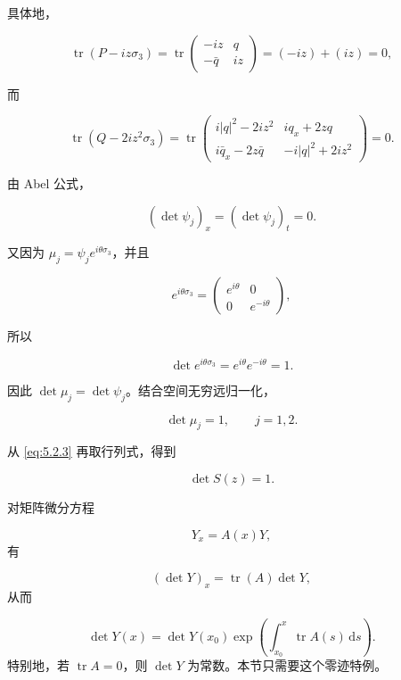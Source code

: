 \documentclass[
    lang=cn,
    scheme=chinese,
    mode=simple,
    device=normal,
    color=blue,
    math=cm,
    thmcnt=section,
    12pt
]{elegantbook}
\begin{document}
具体地，

\[
    \operatorname{tr}(P-iz\sigma_3)
    =
    \operatorname{tr}
    \begin{pmatrix}
        -iz & q \\
        -\bar q & iz
    \end{pmatrix}
    =
    (-iz)+(iz)
    =0,
\]

而

\[
    \operatorname{tr}(Q-2iz^2\sigma_3)
    =
    \operatorname{tr}
    \begin{pmatrix}
        i\lvert q\rvert^2-2iz^2 & iq_x+2zq \\
        i\bar q_x-2z\bar q & -i\lvert q\rvert^2+2iz^2
    \end{pmatrix}
    =0.
\]

由 Abel 公式，

\begin{equation}
    (\det\psi_j)_x
    =
    (\det\psi_j)_t
    =
    0.
    \tag{5.2.20}
    \label{eq:5.2.20}
\end{equation}

又因为 $\mu_j=\psi_je^{i\theta\sigma_3}$，并且

\[
    e^{i\theta\sigma_3}
    =
    \begin{pmatrix}
        e^{i\theta} & 0 \\
        0 & e^{-i\theta}
    \end{pmatrix},
\]

所以

\[
    \det e^{i\theta\sigma_3}
    =
    e^{i\theta}e^{-i\theta}
    =1.
\]

因此 $\det\mu_j=\det\psi_j$。结合空间无穷远归一化，

\begin{equation}
    \det\mu_j=1,\qquad j=1,2.
    \tag{5.2.21}
    \label{eq:5.2.21}
\end{equation}

从 \eqref{eq:5.2.3} 再取行列式，得到

\[
    \det S(z)=1.
\]

\begin{callout}
    对矩阵微分方程

    \[
        Y_x=A(x)Y,
    \]
    有

    \[
        (\det Y)_x=\operatorname{tr}(A)\det Y,
    \]
    从而

    \[
        \det Y(x)
        =
        \det Y(x_0)
        \exp\!\left(\int_{x_0}^{x}\operatorname{tr}A(s)\,\mathrm ds\right).
    \]
    特别地，若 $\operatorname{tr}A=0$，则 $\det Y$ 为常数。本节只需要这个零迹特例。
\end{callout}
\end{document}
